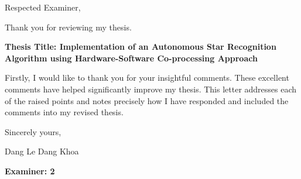 \documentclass[dvips,a4paper,12pt]{report}
\begin{document}


\noindent Respected Examiner,

\noindent Thank you for reviewing my thesis.

\begin{center}
    \textbf{Thesis Title: Implementation of an Autonomous Star Recognition Algorithm using Hardware-Software Co-processing Approach} 
\end{center}

\noindent Firstly, I would like to thank you for your insightful comments. These excellent comments have helped significantly improve my thesis. This letter addresses each of the raised points and notes precisely how I have responded and included the comments into my revised thesis. \\

\vspace{0.5in}

\noindent Sincerely yours,

\noindent Dang Le Dang Khoa

\newpage

\color{blue}
\noindent \large{\textbf{Examiner: 2}}
\end{document}
